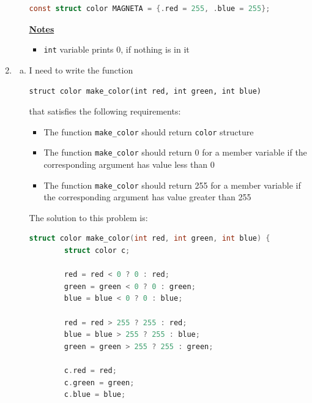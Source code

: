 \documentclass[12pt]{article}
\begin{document}
\begin{enumerate}[1.]
\begin{enumerate}[a)]
\begin{lstlisting}[language=c]
    const struct color MAGNETA = {.red = 255, .blue = 255};
\end{lstlisting}

        \bigskip

        \underline{\textbf{Notes}}

        \begin{itemize}
            \item \texttt{int} variable prints 0, if nothing is in it
        \end{itemize}
    \end{enumerate}

    \item

    \begin{enumerate}[a)]
        \item

        I need to write the function

        \bigskip

        \texttt{struct color make\_color(int red, int green, int blue)}

        \bigskip

        that satisfies the following requirements:

        \begin{itemize}
            \item The function \texttt{make\_color} should return \texttt{color} structure
            \item The function \texttt{make\_color} should return 0 for a member variable if the corresponding argument has value less than 0
            \item The function \texttt{make\_color} should return 255 for a member variable if the corresponding argument has value greater than 255
        \end{itemize}

        \bigskip

        The solution to this problem is:

\begin{lstlisting}[language=c]
    struct color make_color(int red, int green, int blue) {
        struct color c;

        red = red < 0 ? 0 : red;
        green = green < 0 ? 0 : green;
        blue = blue < 0 ? 0 : blue;

        red = red > 255 ? 255 : red;
        blue = blue > 255 ? 255 : blue;
        green = green > 255 ? 255 : green;

        c.red = red;
        c.green = green;
        c.blue = blue;


\end{lstlisting}
\end{enumerate}
\end{enumerate}
\end{document}
